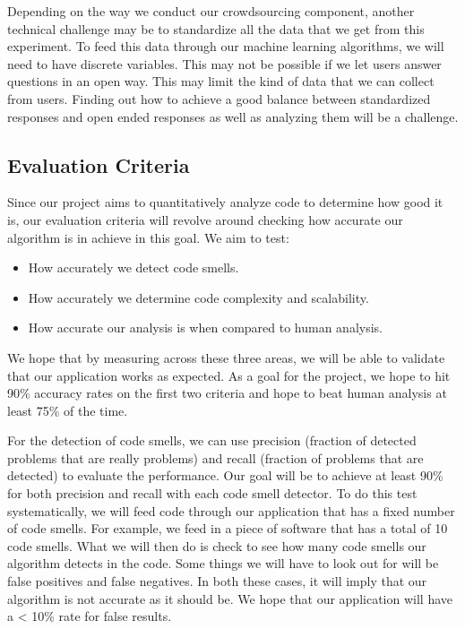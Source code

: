 \documentclass{sig-alternate}
\begin{document}
Depending on the way we conduct our crowdsourcing component, another technical challenge may be to standardize all the data that we get from this experiment. To feed this data through our machine learning algorithms, we will need to have discrete variables. This may not be possible if we let users answer questions in an open way. This may limit the kind of data that we can collect from users. Finding out how to achieve a good balance between standardized responses and open ended responses as well as analyzing them will be a challenge.

\subsection{Evaluation Criteria}
\label{subsec:eval_criteria}

Since our project aims to quantitatively analyze code to determine how good it is, our evaluation criteria will revolve around checking how accurate our algorithm is in achieve in this goal. We aim to test:

\begin{itemize}
\item How accurately we detect code smells.
\item How accurately we determine code complexity and scalability.
\item How accurate our analysis is when compared to human analysis.
\end{itemize}

We hope that by measuring across these three areas, we will be able to validate that our application works as expected. As a goal for the project, we hope to hit 90\% accuracy rates on the first two criteria and hope to beat human analysis at least 75\% of the time.

For the detection of code smells, we can use precision (fraction of detected problems that are really problems) and recall (fraction of problems that are detected) to evaluate the performance. Our goal will be to achieve at least 90\% for both precision and recall with each code smell detector. To do this test systematically, we will feed code through our application that has a fixed number of code smells. For example, we feed in a piece of software that has a total of 10 code smells. What we will then do is check to see how many code smells our algorithm detects in the code. Some things we will have to look out for will be false positives and false negatives. In both these cases, it will imply that our algorithm is not accurate as it should be. We hope that our application will have a < 10\% rate for false results. 
\end{document}
